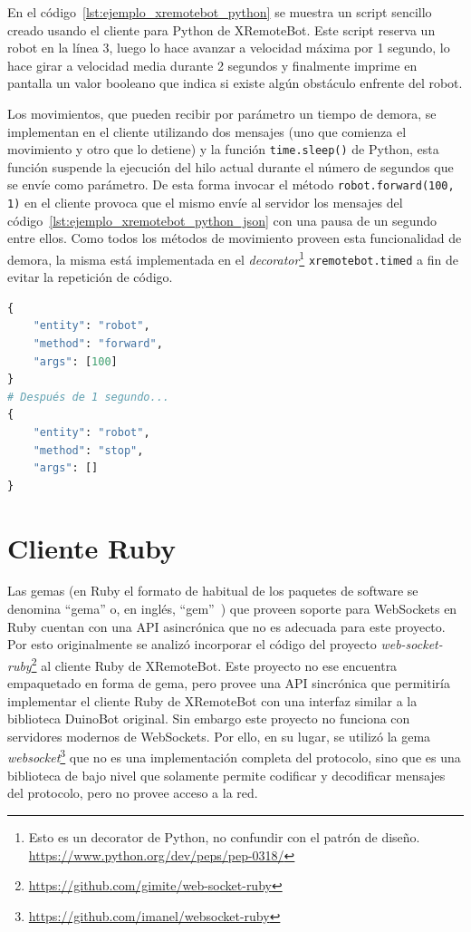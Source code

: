 En el código~\ref{lst:ejemplo_xremotebot_python} se muestra
un script sencillo creado usando el cliente para Python de XRemoteBot. Este
script reserva un robot en la línea 3, luego lo hace avanzar
a velocidad máxima por 1 segundo, lo hace girar a velocidad media
durante 2 segundos y finalmente imprime en pantalla un valor booleano
que indica si existe algún obstáculo enfrente del robot.

Los movimientos, que pueden recibir por parámetro un tiempo de demora,
se implementan en el cliente
utilizando dos mensajes (uno que comienza el movimiento y otro que lo detiene)
y la función \texttt{time.sleep()} de Python,
esta función suspende la ejecución del hilo actual durante el número
de segundos que se envíe como parámetro. De esta
forma
invocar el método \texttt{robot.forward(100, 1)} en el cliente provoca que
el mismo envíe al servidor los mensajes del
código~\ref{lst:ejemplo_xremotebot_python_json} con una pausa de un segundo
entre ellos. Como todos los métodos de movimiento
proveen esta funcionalidad de demora, la misma está implementada en el
\textit{decorator}\footnote{Esto es un decorator de Python, no confundir
con el patrón de diseño. \url{https://www.python.org/dev/peps/pep-0318/}}
\texttt{xremotebot.timed} a fin de evitar la repetición de código.

\begin{lstlisting}[language=Python,
caption={Mensajes generados al invocar \texttt{robot.forward(100, 1)} en
XRemoteBot para Python}, label=lst:ejemplo_xremotebot_python_json]
{
    "entity": "robot",
    "method": "forward",
    "args": [100]
}
# Después de 1 segundo...
{
    "entity": "robot",
    "method": "stop",
    "args": []
}
\end{lstlisting}


\section{Cliente Ruby}\label{ch4:ruby}

Las gemas (en Ruby el formato de habitual de los paquetes de software
se denomina ``gema'' o, en inglés, ``gem''~\citep{thomas_2013})
que proveen soporte para WebSockets en Ruby cuentan con una API
asincrónica que no es adecuada para este proyecto.
Por esto originalmente se analizó incorporar el código del proyecto
\textit{web-socket-ruby}\footnote{\url{https://github.com/gimite/web-socket-ruby}}
al cliente Ruby de XRemoteBot. Este proyecto no ese encuentra empaquetado en
forma de gema, pero provee una API sincrónica que permitiría implementar el
cliente Ruby de XRemoteBot
con una interfaz similar a la biblioteca DuinoBot original.
Sin embargo este proyecto no funciona
con servidores modernos de WebSockets. Por ello, en su lugar,
se utilizó la gema \textit{websocket}\footnote{\url{https://github.com/imanel/websocket-ruby}}
que no es una implementación completa
del protocolo, sino que es una biblioteca de bajo nivel que
solamente permite codificar y decodificar mensajes del protocolo, pero no provee
acceso a la red.

